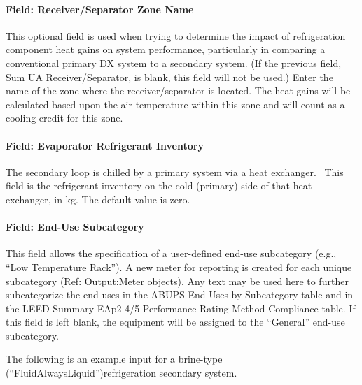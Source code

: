 \paragraph{Field: Receiver/Separator Zone Name}\label{field-receiverseparator-zone-name}

This optional field is used when trying to determine the impact of refrigeration component heat gains on system performance, particularly in comparing a conventional primary DX system to a secondary system. (If the previous field, Sum UA Receiver/Separator, is blank, this field will not be used.) Enter the name of the zone where the receiver/separator is located. The heat gains will be calculated based upon the air temperature within this zone and will count as a cooling credit for this zone.

\paragraph{Field: Evaporator Refrigerant Inventory}\label{field-evaporator-refrigerant-inventory}

The secondary loop is chilled by a primary system via a heat exchanger.~ This field is the refrigerant inventory on the cold (primary) side of that heat exchanger, in kg. The default value is zero.

\paragraph{Field: End-Use Subcategory}\label{field-end-use-subcategory-8}

This field allows the specification of a user-defined end-use subcategory (e.g., ``Low Temperature Rack''). A new meter for reporting is created for each unique subcategory (Ref: \hyperref[outputmeter-and-outputmetermeterfileonly]{Output:Meter} objects). Any text may be used here to further subcategorize the end-uses in the ABUPS End Uses by Subcategory table and in the LEED Summary EAp2-4/5 Performance Rating Method Compliance table. If this field is left blank, the equipment will be assigned to the ``General'' end-use subcategory.

The following is an example input for a brine-type (``FluidAlwaysLiquid'')refrigeration secondary system.

